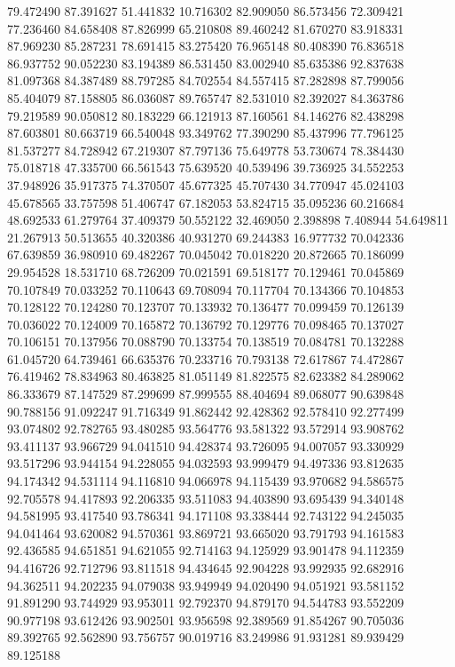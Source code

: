 79.472490
87.391627
51.441832
10.716302
82.909050
86.573456
72.309421
77.236460
84.658408
87.826999
65.210808
89.460242
81.670270
83.918331
87.969230
85.287231
78.691415
83.275420
76.965148
80.408390
76.836518
86.937752
90.052230
83.194389
86.531450
83.002940
85.635386
92.837638
81.097368
84.387489
88.797285
84.702554
84.557415
87.282898
87.799056
85.404079
87.158805
86.036087
89.765747
82.531010
82.392027
84.363786
79.219589
90.050812
80.183229
66.121913
87.160561
84.146276
82.438298
87.603801
80.663719
66.540048
93.349762
77.390290
85.437996
77.796125
81.537277
84.728942
67.219307
87.797136
75.649778
53.730674
78.384430
75.018718
47.335700
66.561543
75.639520
40.539496
39.736925
34.552253
37.948926
35.917375
74.370507
45.677325
45.707430
34.770947
45.024103
45.678565
33.757598
51.406747
67.182053
53.824715
35.095236
60.216684
48.692533
61.279764
37.409379
50.552122
32.469050
2.398898
7.408944
54.649811
21.267913
50.513655
40.320386
40.931270
69.244383
16.977732
70.042336
67.639859
36.980910
69.482267
70.045042
70.018220
20.872665
70.186099
29.954528
18.531710
68.726209
70.021591
69.518177
70.129461
70.045869
70.107849
70.033252
70.110643
69.708094
70.117704
70.134366
70.104853
70.128122
70.124280
70.123707
70.133932
70.136477
70.099459
70.126139
70.036022
70.124009
70.165872
70.136792
70.129776
70.098465
70.137027
70.106151
70.137956
70.088790
70.133754
70.138519
70.084781
70.132288
61.045720
64.739461
66.635376
70.233716
70.793138
72.617867
74.472867
76.419462
78.834963
80.463825
81.051149
81.822575
82.623382
84.289062
86.333679
87.147529
87.299699
87.999555
88.404694
89.068077
90.639848
90.788156
91.092247
91.716349
91.862442
92.428362
92.578410
92.277499
93.074802
92.782765
93.480285
93.564776
93.581322
93.572914
93.908762
93.411137
93.966729
94.041510
94.428374
93.726095
94.007057
93.330929
93.517296
93.944154
94.228055
94.032593
93.999479
94.497336
93.812635
94.174342
94.531114
94.116810
94.066978
94.115439
93.970682
94.586575
92.705578
94.417893
92.206335
93.511083
94.403890
93.695439
94.340148
94.581995
93.417540
93.786341
94.171108
93.338444
92.743122
94.245035
94.041464
93.620082
94.570361
93.869721
93.665020
93.791793
94.161583
92.436585
94.651851
94.621055
92.714163
94.125929
93.901478
94.112359
94.416726
92.712796
93.811518
94.434645
92.904228
93.992935
92.682916
94.362511
94.202235
94.079038
93.949949
94.020490
94.051921
93.581152
91.891290
93.744929
93.953011
92.792370
94.879170
94.544783
93.552209
90.977198
93.612426
93.902501
93.956598
92.389569
91.854267
90.705036
89.392765
92.562890
93.756757
90.019716
83.249986
91.931281
89.939429
89.125188
